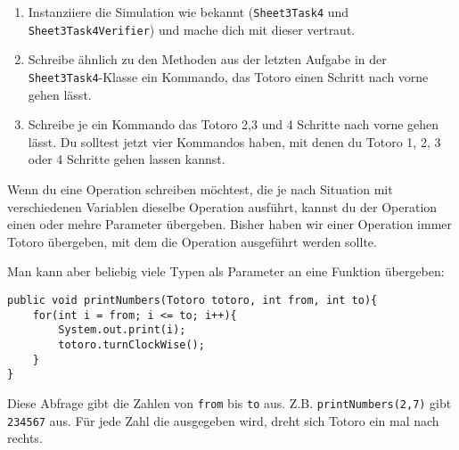 
\begin{enumerate}
	\item
	Instanziiere die Simulation wie bekannt (\lstinline{Sheet3Task4} und \lstinline{Sheet3Task4Verifier}) und mache dich mit dieser vertraut.
\item
Schreibe ähnlich zu den Methoden aus der letzten Aufgabe in der \lstinline{Sheet3Task4}-Klasse ein Kommando, das Totoro einen Schritt nach vorne gehen lässt.
\item
Schreibe je ein Kommando das Totoro 2,3 und 4 Schritte nach vorne gehen lässt.
Du solltest jetzt vier Kommandos haben, mit denen du Totoro 1, 2, 3 oder 4 Schritte gehen lassen kannst.
\end{enumerate}

\begin{Infobox}[Operationsparameter]
Wenn du eine Operation schreiben möchtest, die je nach Situation mit verschiedenen Variablen dieselbe Operation ausführt, kannst du der Operation einen oder mehre Parameter übergeben.
Bisher haben wir einer Operation immer Totoro übergeben, mit dem die Operation ausgeführt werden sollte.\newline

Man kann aber beliebig viele Typen als Parameter an eine Funktion übergeben:

	\begin{lstlisting}[xleftmargin=0.5cm]
public void printNumbers(Totoro totoro, int from, int to){
    for(int i = from; i <= to; i++){
		System.out.print(i);
		totoro.turnClockWise();
    }
}
	\end{lstlisting}

	Diese Abfrage gibt die Zahlen von \lstinline{from} bis \lstinline{to} aus.
	Z.B. \lstinline{printNumbers(2,7)} gibt \lstinline{234567} aus.
	Für jede Zahl die ausgegeben wird, dreht sich Totoro ein mal nach rechts.
\end {Infobox}


